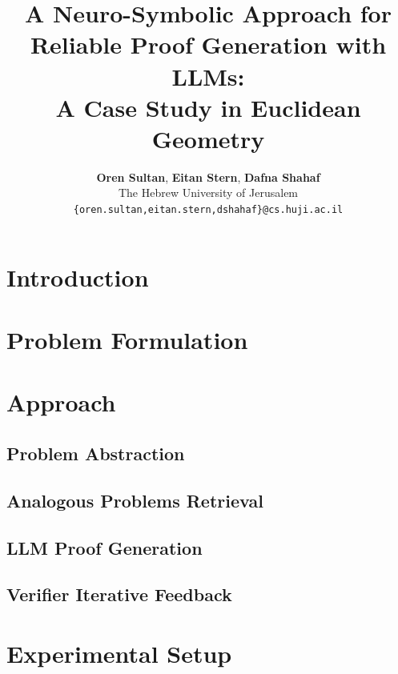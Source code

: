 \documentclass[11pt]{article}
\title{A Neuro-Symbolic Approach for Reliable Proof Generation with LLMs: \\ 
A Case Study in Euclidean Geometry
}
\author{
\textbf{Oren Sultan}, \textbf{Eitan Stern}, \textbf{Dafna Shahaf} \\
The Hebrew University of Jerusalem \\
\texttt{\{oren.sultan,eitan.stern,dshahaf\}@cs.huji.ac.il} \\
}
\begin{document}
\maketitle

\begin{abstract}

\end{abstract}

\section{Introduction}


\section{Problem Formulation}
\label{sec:problem_defintion}



\section{Approach}

\subsection{Problem Abstraction}
\label{subsec:problems_abstraction}


\subsection{Analogous Problems Retrieval}
\label{subsec:similar_problems_retrieval}



\subsection{LLM Proof Generation}
\label{subsec:llm_solver}


\subsection{Verifier Iterative Feedback}
\label{subsec:verifier}



\section{Experimental Setup}
\end{document}
